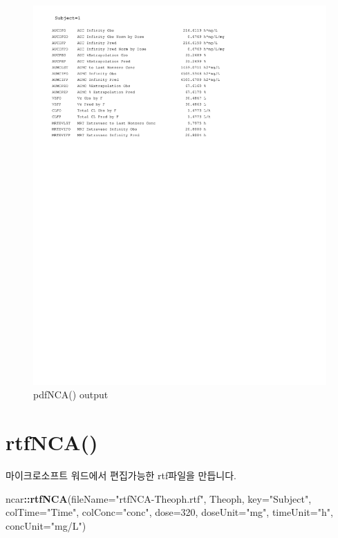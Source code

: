 \documentclass[9pt,]{krantz}
\newenvironment{Shaded}{\begin{snugshade}}{\end{snugshade}}
\newcommand{\DataTypeTok}[1]{\textcolor[rgb]{0.13,0.29,0.53}{#1}}
\newcommand{\DecValTok}[1]{\textcolor[rgb]{0.00,0.00,0.81}{#1}}
\newcommand{\KeywordTok}[1]{\textcolor[rgb]{0.13,0.29,0.53}{\textbf{#1}}}
\newcommand{\NormalTok}[1]{#1}
\newcommand{\OperatorTok}[1]{\textcolor[rgb]{0.81,0.36,0.00}{\textbf{#1}}}
\newcommand{\StringTok}[1]{\textcolor[rgb]{0.31,0.60,0.02}{#1}}
\begin{document}
\begin{figure}
\includegraphics[width=17.71in]{Output-ncar/pdfNCA-Theoph-02} \caption{pdfNCA() output}\label{fig:pdfnca-output2}
\end{figure}

\hypertarget{rtfnca}{%
\section{rtfNCA()}\label{rtfnca}}

마이크로소프트 워드에서 편집가능한 rtf파일을 만듭니다.

\begin{Shaded}
\begin{Highlighting}[]
\NormalTok{ncar}\OperatorTok{::}\KeywordTok{rtfNCA}\NormalTok{(}\DataTypeTok{fileName=}\StringTok{"rtfNCA-Theoph.rtf"}\NormalTok{, Theoph, }\DataTypeTok{key=}\StringTok{"Subject"}\NormalTok{, }
             \DataTypeTok{colTime=}\StringTok{"Time"}\NormalTok{, }\DataTypeTok{colConc=}\StringTok{"conc"}\NormalTok{, }\DataTypeTok{dose=}\DecValTok{320}\NormalTok{, }\DataTypeTok{doseUnit=}\StringTok{"mg"}\NormalTok{, }
             \DataTypeTok{timeUnit=}\StringTok{"h"}\NormalTok{, }\DataTypeTok{concUnit=}\StringTok{"mg/L"}\NormalTok{)}
\end{Highlighting}
\end{Shaded}
\end{document}
